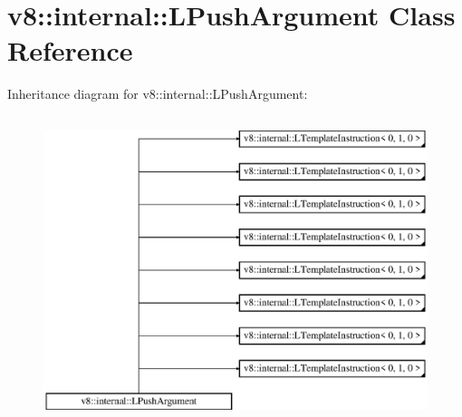 \hypertarget{classv8_1_1internal_1_1_l_push_argument}{}\section{v8\+:\+:internal\+:\+:L\+Push\+Argument Class Reference}
\label{classv8_1_1internal_1_1_l_push_argument}
Inheritance diagram for v8\+:\+:internal\+:\+:L\+Push\+Argument\+:\begin{figure}[H]
\begin{center}
\leavevmode
\includegraphics[height=9.000000cm]{classv8_1_1internal_1_1_l_push_argument}
\end{center}
\end{figure}
